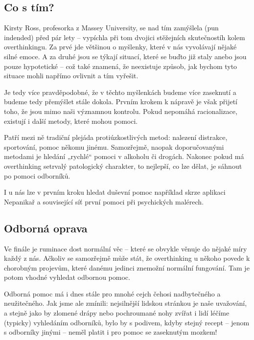 \documentclass[main.tex]{subfiles}
\begin{document}
\subsection*{Co s tím?}
Kirsty Ross, profesorka z Massey University, se nad tím zamýšlela (pun indended) před pár lety – vypíchla při tom dvojici stěžejních skutečnostíh kolem overthinkingu. Za prvé jde většinou o myšlenky, které v nás vyvolávají nějaké silné emoce. A za druhé jsou se týkají situací, které se buďto již staly anebo jsou pouze hypotetické – což také znamená, že neexistuje způsob, jak bychom tyto situace mohli napřímo ovlivnit a tím vyřešit.\par
Je tedy více pravděpodobné, že v těchto myšlenkách budeme více zaseknutí a budeme tedy přemýšlet stále dokola. Prvním krokem k nápravě je však přijetí toho, že jsou mimo naši významnou kontrolu. Pokud nepomáhá racionalizace, existují i další metody, které mohou pomoci.\par
Patří mezi ně tradiční plejáda protiúzkostlivých metod: nalezení distrakce, sportování, pomoc někomu jinému. Samozřejmě, naopak doporučovanými metodami je hledání „rychlé“ pomoci v alkoholu či drogách. Nakonec pokud má overthinking setrvalý patologický charakter, to nejlepší, co lze dělat, je sáhnout po pomoci odborníků.\par
I u nás lze v prvním kroku hledat duševní pomoc například skrze aplikaci Nepanikař a související síť první pomoci při psychických malérech.
\subsection*{Odborná oprava}
Ve finále je ruminace dost normální věc – které se obvykle věnuje do nějaké míry každý z nás. Ačkoliv se samozřejmě může stát, že overthinking u někoho povede k chorobným projevům, které danému jedinci znemožní normální fungování. Tam je potom vhodné vyhledat odbornou pomoc.\par
Odborná pomoc má i dnes stále pro mnohé cejch čehosi nadbytečného a neužitečného. Jak jsme ale zmínili: nejsilnější lidskou stránkou je naše uvažování, a stejně jako by zlomené drápy nebo pochroumané nohy zvířat i lidí léčíme (typicky) vyhledáním odborníků, bylo by s podivem, kdyby stejný recept – jenom s odborníky jinými – neměl platit i pro pomoc se zaseknutým mozkem!
\newpage
\end{document}
